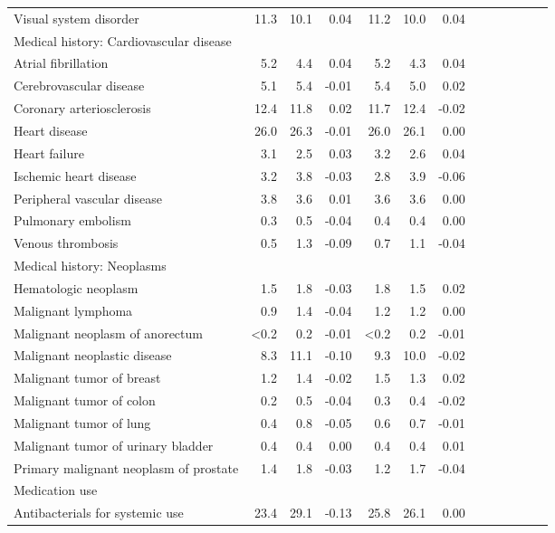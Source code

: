 \documentclass[11pt,]{article}
\begin{document}
\begin{longtable}{lrrrrrrrrrrrr}
      Visual system disorder & 11.3 & 10.1 &  0.04 & 11.2 & 10.0 &  0.04 \\ 
  Medical history: Cardiovascular disease &    &    &     &    &    &     \\ 
      Atrial fibrillation &  5.2 &  4.4 &  0.04 &  5.2 &  4.3 &  0.04 \\ 
      Cerebrovascular disease &  5.1 &  5.4 & -0.01 &  5.4 &  5.0 &  0.02 \\ 
      Coronary arteriosclerosis & 12.4 & 11.8 &  0.02 & 11.7 & 12.4 & -0.02 \\ 
      Heart disease & 26.0 & 26.3 & -0.01 & 26.0 & 26.1 &  0.00 \\ 
      Heart failure &  3.1 &  2.5 &  0.03 &  3.2 &  2.6 &  0.04 \\ 
      Ischemic heart disease &  3.2 &  3.8 & -0.03 &  2.8 &  3.9 & -0.06 \\ 
      Peripheral vascular disease &  3.8 &  3.6 &  0.01 &  3.6 &  3.6 &  0.00 \\ 
      Pulmonary embolism &  0.3 &  0.5 & -0.04 &  0.4 &  0.4 &  0.00 \\ 
      Venous thrombosis &  0.5 &  1.3 & -0.09 &  0.7 &  1.1 & -0.04 \\ 
  Medical history: Neoplasms &    &    &     &    &    &     \\ 
      Hematologic neoplasm &  1.5 &  1.8 & -0.03 &  1.8 &  1.5 &  0.02 \\ 
      Malignant lymphoma &  0.9 &  1.4 & -0.04 &  1.2 &  1.2 &  0.00 \\ 
      Malignant neoplasm of anorectum & <0.2 &  0.2 & -0.01 & <0.2 &  0.2 & -0.01 \\ 
      Malignant neoplastic disease &  8.3 & 11.1 & -0.10 &  9.3 & 10.0 & -0.02 \\ 
      Malignant tumor of breast &  1.2 &  1.4 & -0.02 &  1.5 &  1.3 &  0.02 \\ 
      Malignant tumor of colon &  0.2 &  0.5 & -0.04 &  0.3 &  0.4 & -0.02 \\ 
      Malignant tumor of lung &  0.4 &  0.8 & -0.05 &  0.6 &  0.7 & -0.01 \\ 
      Malignant tumor of urinary bladder &  0.4 &  0.4 &  0.00 &  0.4 &  0.4 &  0.01 \\ 
      Primary malignant neoplasm of prostate &  1.4 &  1.8 & -0.03 &  1.2 &  1.7 & -0.04 \\ 
  Medication use &    &    &     &    &    &     \\ 
      Antibacterials for systemic use & 23.4 & 29.1 & -0.13 & 25.8 & 26.1 &  0.00 \\ 

\end{longtable}
\end{document}
